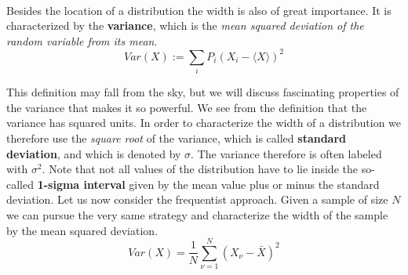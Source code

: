\documentclass[12pt, a4paper]{scrartcl}
\begin{document}
\\

Besides the location of a distribution the width is also of great importance. It is characterized by the \textbf{variance}, which is the \textit{mean squared deviation of the random variable from its mean}.\\

\begin{equation*}\boxed{Var(X):=\sum_iP_i(X_i-\langle X \rangle)^2}\end{equation*}

This definition may fall from the sky, but we will discuss fascinating properties of the variance that makes it so powerful.
We see from the definition that the variance has squared units. In order to characterize the width of a distribution we therefore use the \textit{square root} of the variance, which is called \textbf{standard deviation}, and which is denoted by $\sigma$. 
The variance therefore is often labeled with $\sigma^2$. Note that not all values of the distribution have to lie inside the so-called \textbf{1-sigma interval} given by the mean value plus or minus the standard deviation.
Let us now consider the frequentist approach. Given a sample of size $N$ we can pursue the very same strategy and characterize the width of the sample by the mean squared deviation.\\

\begin{equation*}\boxed{Var(X)=\frac 1N\sum_{\nu = 1}^N(X_\nu-\bar{X})^2}\end{equation*}
\end{document}
